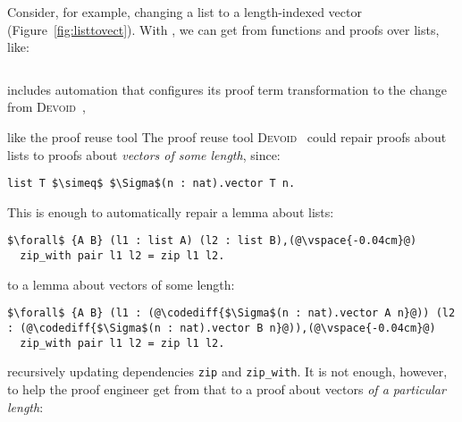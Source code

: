 \begin{figure*}
\begin{minipage}{0.40\textwidth}
   
\end{minipage}
\hfill
\begin{minipage}{0.58\textwidth}
   
\end{minipage}
\vspace{-0.3cm}
\caption{A vector (right) is a list (left) indexed by its length.}
\label{fig:listtovect}
\end{figure*}

Consider, for example, changing a list to a length-indexed vector (Figure~\ref{fig:listtovect}).
With \toolname, we can get from functions and proofs over lists, like:

\begin{lstlisting}
\end{lstlisting}



\toolname

 includes automation that configures its proof term transformation to the change from
\textsc{Devoid}~\cite{Ringer2019}, 

 like the proof reuse tool 
The proof reuse tool \textsc{Devoid}~\cite{Ringer2019} could repair proofs about lists to proofs about \textit{vectors of some length}, since:

\begin{lstlisting}
list T $\simeq$ $\Sigma$(n : nat).vector T n.
\end{lstlisting}
This is enough to automatically repair a lemma about lists:

\begin{lstlisting}
$\forall$ {A B} (l1 : list A) (l2 : list B),(@\vspace{-0.04cm}@)
  zip_with pair l1 l2 = zip l1 l2.
\end{lstlisting}
to a lemma about vectors of some length:

\begin{lstlisting}
$\forall$ {A B} (l1 : (@\codediff{$\Sigma$(n : nat).vector A n}@)) (l2 : (@\codediff{$\Sigma$(n : nat).vector B n}@)),(@\vspace{-0.04cm}@)
  zip_with pair l1 l2 = zip l1 l2.
\end{lstlisting}
recursively updating dependencies \lstinline{zip} and \lstinline{zip_with}.
It is not enough, however, to help the proof engineer get from that to a proof about vectors \textit{of a particular length}:

